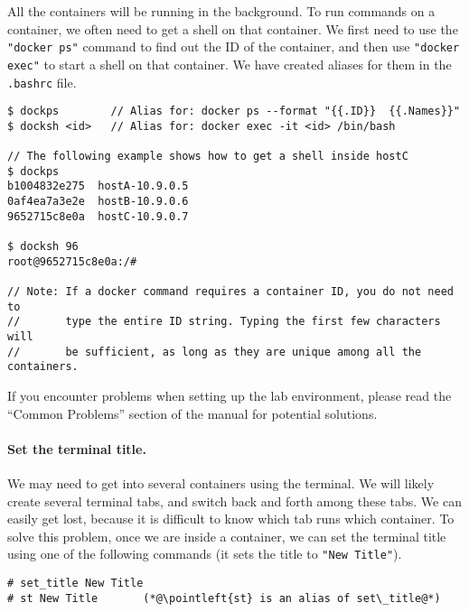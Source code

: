 All the containers will be running in the background. To run
commands on a container, we often need to get a shell on
that container. We first need to use the \texttt{"docker ps"}  
command to find out the ID of the container, and then
use \texttt{"docker exec"} to start a shell on that 
container. We have created aliases for them in
the \texttt{.bashrc} file.

\begin{lstlisting}
$ dockps        // Alias for: docker ps --format "{{.ID}}  {{.Names}}" 
$ docksh <id>   // Alias for: docker exec -it <id> /bin/bash

// The following example shows how to get a shell inside hostC
$ dockps
b1004832e275  hostA-10.9.0.5
0af4ea7a3e2e  hostB-10.9.0.6
9652715c8e0a  hostC-10.9.0.7

$ docksh 96
root@9652715c8e0a:/#  

// Note: If a docker command requires a container ID, you do not need to 
//       type the entire ID string. Typing the first few characters will 
//       be sufficient, as long as they are unique among all the containers. 
\end{lstlisting}


If you encounter problems when setting up the lab environment, 
please read the ``Common Problems'' section of the manual
for potential solutions.



\paragraph{Set the terminal title.} 
We may need to get into several containers using the terminal.
We will likely create several terminal tabs, and switch back
and forth among these tabs. We can easily get lost, because
it is difficult to know which tab runs which container. 
To solve this problem, once we
are inside a container, we can set the terminal title using
one of the following commands (it sets the title to \texttt{"New Title"}).

\begin{lstlisting}
# set_title New Title
# st New Title       (*@\pointleft{st} is an alias of set\_title@*)
\end{lstlisting}


